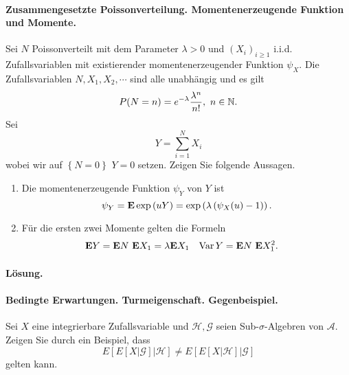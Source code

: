 \paragraph{Zusammengesetzte Poissonverteilung. Momentenerzeugende Funktion und Momente.}
Sei $N$ Poissonverteilt mit dem Parameter $\lambda>0$ und $\left( X_i
\right)_{i\geq 1}$ i.i.d.  Zufallsvariablen mit existierender
momentenerzeugender Funktion $\psi_X$. Die Zufallsvariablen $N, X_1, X_2,
\cdots$ sind alle unabhängig und es gilt 
\begin{equation*}
    P(N=n) = e^{-\lambda} \frac{\lambda^n}{ n!}, \ n\in\mathbb N. 
\end{equation*}
Sei
\begin{equation*}
    Y = \sum_{i=1}^{N} X_i
\end{equation*}
wobei wir auf $\left\{ N=0 \right\}$ $Y=0$ setzen. Zeigen Sie folgende Aussagen.
\begin{enumerate}
    \item Die momentenerzeugende Funktion $\psi_Y$ von $Y$ ist
        \begin{equation*}
            \psi_Y = \mathbf{E} \exp \left( u Y \right) = 
            \exp \left( \lambda \left( \psi_X(u)-1 \right)  \right).
        \end{equation*}
    \item Für die ersten zwei Momente gelten die Formeln
        \begin{align*}
            \mathbf{E} Y &= \mathbf{E} N \ \mathbf{E} X_1 = \lambda \mathbf{E} X_1 & 
            \operatorname{Var} Y &= \mathbf{E} N \ \mathbf{E} X_1^2. 
        \end{align*}
\end{enumerate}

\paragraph*{Lösung.}



\paragraph{Bedingte Erwartungen. Turmeigenschaft. Gegenbeispiel. } Sei $X$ eine integrierbare Zufallsvariable
und $\mathcal H, \mathcal G$ seien Sub-$\sigma$-Algebren von $\mathcal A$. 
Zeigen Sie durch ein Beispiel, dass 
\begin{equation*}
	E\left[ E\left[ X | \mathcal G \right] | \mathcal H \right] \neq
	E\left[ E\left[ X | \mathcal H \right] | \mathcal G \right]
\end{equation*}
gelten kann. 

